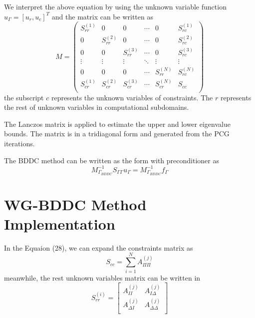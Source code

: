 We interpret the above equation by using the unknown variable function $ u_{\Gamma} = [u_{r}, u_{c}]^{T} $ and the matrix can be written as
\begin{equation}
M = \begin{pmatrix}
S_{rr}^{(1)} & 0 & 0 & \cdots & 0 & S_{rc}^{(1)}\\
0 & S_{rr}^{(2)} & 0 & \cdots & 0 & S_{rc}^{(2)} \\
0 & 0 & S_{rr}^{(3)} & \cdots & 0 & S_{rc}^{(3)} \\
\vdots & \vdots & \vdots & \ddots & \vdots & \vdots \\
0 & 0 & 0 & \cdots & S_{rr}^{(N)} & S_{rc}^{(N)}\\
S_{cr}^{(1)} & S_{cr}^{(2)} & S_{cr}^{(3)} & \cdots & {S_{cr}^{(N)}} & S_{cc} \\
\end{pmatrix}
\end{equation}
the subscript $ c $ represents the unknown variables of constraints. The $ r $ represents the rest of unknown variables in computational subdomains.

The Lanczos matrix is applied to estimate the upper and lower eigenvalue bounds. The matrix is in a tridiagonal form and generated from the PCG iterations.

The BDDC method can be written as the form with preconditioner as
\begin{equation}
M_{\Gamma_{BDDC}}^{-1} S_{\Gamma \Gamma} u_{\Gamma} = M_{\Gamma_{BDDC}}^{-1} f_{\Gamma}
\end{equation}

\section{WG-BDDC Method Implementation}

In the Equaion (28), we can expand the constraints matrix as
\begin{equation}
S_{cc} = \sum_{i=1}^{N} A_{\Pi \Pi}^{(j)}
\end{equation}
meanwhile, the rest unknown variables matrix can be written in
\begin{equation}
S_{rr}^{(i)} = \begin{bmatrix}
A_{II}^{(j)} & A_{I \Delta}^(j) \\
A_{\Delta I}^{(j)} & A_{\Delta \Delta}^{(j)}\\
\end{bmatrix}
\end{equation}

